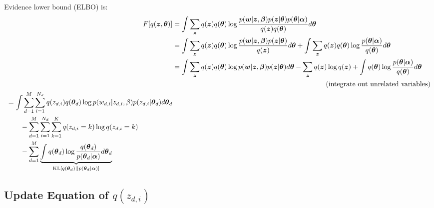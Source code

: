 \documentclass[a4paper,10.5pt,dvipdfmx]{jarticle}  %
\begin{document}
Evidence lower bound (ELBO) is:
\begin{align}
	F[q(\boldsymbol{z}, \boldsymbol{\theta})] &= \int \sum_{\boldsymbol{z}} q(\boldsymbol{z}) q(\boldsymbol{\theta}) \log \frac{p(\boldsymbol{w} | \boldsymbol{z}, \boldsymbol{\beta}) p(\boldsymbol{z} | \boldsymbol{\theta}) p(\boldsymbol{\theta} | \boldsymbol{\alpha})}{q(\boldsymbol{z}) q(\boldsymbol{\theta})} d \boldsymbol{\theta}\\
&= \int \sum_{\boldsymbol{z}} q(\boldsymbol{z}) q(\boldsymbol{\theta}) \log \frac{p(\boldsymbol{w} | \boldsymbol{z}, \boldsymbol{\beta}) p(\boldsymbol{z} | \boldsymbol{\theta})}{q(\boldsymbol{z})} d \boldsymbol{\theta} + \int \sum_{\boldsymbol{z}} q(\boldsymbol{z}) q(\boldsymbol{\theta}) \log \frac{p(\boldsymbol{\theta} | \boldsymbol{\alpha})}{q(\boldsymbol{\theta})} d \boldsymbol{\theta} \\
&=\int \sum_{\boldsymbol{z}} q(\boldsymbol{z}) q(\boldsymbol{\theta}) \log p(\boldsymbol{w} | \boldsymbol{z}, \boldsymbol{\beta}) p(\boldsymbol{z} | \boldsymbol{\theta}) d \boldsymbol{\theta} - \sum_{\boldsymbol{z}} q(\boldsymbol{z}) \log q (\boldsymbol{z}) + \int q(\boldsymbol{\theta}) \log \frac{p(\boldsymbol{\theta} | \boldsymbol{\alpha})}{q(\boldsymbol{\theta})} d \boldsymbol{\theta} \\
&\qquad\qquad\qquad\qquad\qquad\qquad\qquad\qquad\qquad\qquad\qquad ({\rm integrate\ out\ unrelated\ variables}) \nonumber \\
\begin{split}
&= \int \sum_{d=1}^{M} \sum_{i=1}^{N_d} q(z_{d,i}) q(\boldsymbol{\theta}_d) \log p(w_{d,i} | z_{d,i}, \beta) p(z_{d,i} | \boldsymbol{\theta}_d) d \boldsymbol{\theta}_d\\
&\qquad - \sum_{d=1}^{M} \sum_{i=1}^{N_d} \sum_{k=1}^{K} q(z_{d,i} = k) \log q(z_{d,i} = k)\\
&\qquad - \sum_{d=1}^{M} \underbrace{\int q(\boldsymbol{\theta}_d) \log \frac{q(\boldsymbol{\theta}_d)}{p(\boldsymbol{\theta}_d | \boldsymbol{\alpha})} d \boldsymbol{\theta}_d}_{{\rm KL}\left[ q(\boldsymbol{\theta}_d) || p(\boldsymbol{\theta}_d | \boldsymbol{\alpha}) \right]}
\end{split}
\end{align}

\subsection{Update Equation of $q(z_{d,i})$}
\end{document}
